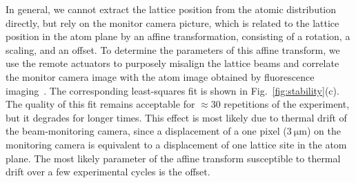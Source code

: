 \documentclass[twocolumn,aps,pra,showpacs,preprintnumbers,bibnotes]{revtex4-1}
\newcommand\unit[2]{\ensuremath{#1~\mathrm{{#2}}}}
\begin{document}
In general, we cannot extract the lattice position from the atomic distribution directly, but rely on the monitor camera picture, which is related to the lattice position in the atom plane by an affine transformation, consisting of a rotation, a scaling, and an offset.
To determine the parameters of this affine transform, we use the remote actuators to purposely misalign the lattice beams and correlate the monitor camera image with the atom image obtained by fluorescence imaging~\cite{Parsons2015}.
The corresponding least-squares fit is shown in Fig.~\ref{fig:stability}(c).
The quality of this fit remains acceptable for $\approx$30 repetitions of the experiment, but it degrades for longer times.
This effect is most likely due to thermal drift of the beam-monitoring camera, since a displacement of a one pixel (\unit{3}{\mu{}m}) on the monitoring camera is equivalent to a displacement of one lattice site in the atom plane.
The most likely parameter of the affine transform susceptible to thermal drift over a few experimental cycles is the offset.
\end{document}
